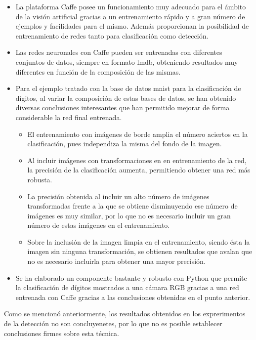 \begin{itemize}
	\item La plataforma Caffe posee un funcionamiento muy adecuado para el ámbito de la visión artificial gracias a un entrenamiento rápido y a gran número de ejemplos y facilidades para el mismo. Además proporcionan la posibilidad de entrenamiento de redes tanto para clasificación como detección.
	\item Las redes neuronales con Caffe pueden ser entrenadas con diferentes conjuntos de datos, siempre en formato \acrshort{lmdb}, obteniendo resultados muy diferentes en función de la composición de las mismas. 
	\item Para el ejemplo tratado con la base de datos \acrshort{mnist} para la clasificación de dígitos, al variar la composición de estas bases de datos, se han obtenido diversas conclusiones interesantes que han permitido mejorar de forma considerable la red final entrenada.
	\begin{itemize}
		\item El entrenamiento con imágenes de borde amplia el número aciertos en la clasificación, pues independiza la misma del fondo de la imagen.
		\item Al incluir imágenes con transformaciones en en entrenamiento de la red, la precisión de la clasificación aumenta, permitiendo obtener una red más robusta.
		\item La precisión obtenida al incluir un alto número de imágenes transformadas frente a la que se obtiene disminuyendo ese número de imágenes es muy similar, por lo que no es necesario incluir un gran número de estas imágenes en el entrenamiento.
		\item Sobre la inclusión de la imagen limpia en el entrenamiento, siendo ésta la imagen sin ninguna transformación, se obtienen resultados que avalan que no es necesario incluirla para obtener una mayor precisión.
	\end{itemize}
	\item Se ha elaborado un componente bastante y robusto con Python que permite la clasificación de dígitos mostrados a una cámara RGB gracias a una red entrenada con Caffe gracias a las conclusiones obtenidas en el punto anterior.
\end{itemize}

Como se mencionó anteriormente, los resultados obtenidos en los exprerimentos de la detección no son concluyenetes, por lo que no es posible establecer conclusiones firmes sobre esta técnica.

